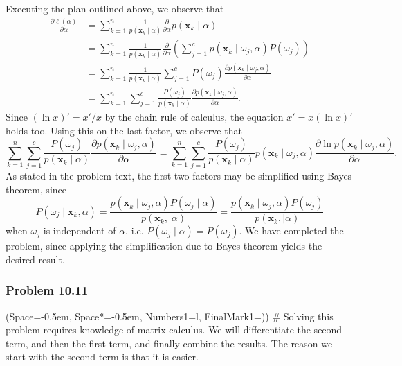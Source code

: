 \documentclass[12pt, a4paper]{article}
\newcommand{\listSpace}{-0.5em}%
\newcommand{\vect}[1]{\bm{#1}}
\begin{document}
{Executing the plan outlined above, we observe that
\begin{align*}
	\frac{\partial \ell(\alpha)}{ \partial \alpha}
	&= \sum_{k=1}^{n} \frac{1}{p \left( \vect{x}_k \mid \alpha \right)}
	\frac{\partial}{\partial \alpha}
	 p \left( \vect{x}_k \mid \alpha \right) 	\\
	&= \sum_{k=1}^{n} \frac{1}{p \left( \vect{x}_k \mid \alpha \right)}
	\frac{\partial}{\partial \alpha}
	\left( \sum_{j=1}^{c} p \left( \vect{x}_k \mid \omega_j,  \alpha \right) P(\omega_j) \right) \tag{by definition}	
	\\
	&= \sum_{k=1}^{n} \frac{1}{p \left( \vect{x}_k \mid \alpha \right)}
	 \sum_{j=1}^{c} P(\omega_j) \frac{\partial p \left( \vect{x}_k \mid \omega_j,  \alpha \right)}{\partial \alpha} 
	 \\
	 &= \sum_{k=1}^{n} \sum_{j=1}^{c} \frac{P(\omega_j)}{p \left( \vect{x}_k \mid \alpha \right)}
	   \frac{\partial p \left( \vect{x}_k \mid \omega_j,  \alpha \right)}{\partial \alpha} . \tag{constant into sum}
\end{align*}
Since $(\ln x)' = x' / x$ by the chain rule of calculus, the equation $x' = x (\ln x)'$ holds too.
Using this on the last factor, we observe that 
\begin{equation*}
	\sum_{k=1}^{n} \sum_{j=1}^{c} \frac{P(\omega_j)}{p \left( \vect{x}_k \mid \alpha \right)}
	\frac{\partial p \left( \vect{x}_k \mid \omega_j,  \alpha \right)}{\partial \alpha}
	=
	\sum_{k=1}^{n} \sum_{j=1}^{c} \frac{P(\omega_j)}{p \left( \vect{x}_k \mid \alpha \right)} 
	p \left( \vect{x}_k \mid \omega_j,  \alpha \right)
	\frac{\partial \ln p \left( \vect{x}_k \mid \omega_j,  \alpha \right)}{\partial \alpha}.
\end{equation*}
As stated in the problem text, the first two factors may be simplified using Bayes theorem, since
\begin{equation*}
	P( \omega_j \mid \vect{x}_k, \alpha) 
	= 
	\frac{p(\vect{x}_k \mid  \omega_j, \alpha) P(\omega_j \mid \alpha)}{p( \vect{x}_k,\mid \alpha)}
	= 
	\frac{p(\vect{x}_k \mid  \omega_j, \alpha) P(\omega_j)}{p( \vect{x}_k,\mid \alpha)}
\end{equation*}
when $\omega_j$ is independent of $\alpha$, i.e. $P(\omega_j \mid \alpha) = P(\omega_j )$.
We have completed the problem, since applying the simplification due to Bayes theorem yields the desired result.


\subsubsection*{Problem 10.11}
\begin{easylist}[enumerate]
\ListProperties(Space=\listSpace, Space*=\listSpace, Numbers1=l, FinalMark1={)})
# Solving this problem requires knowledge of matrix calculus.
We will differentiate the second term, and then the first term, and finally combine the results.
The reason we start with the second term is that it is easier.


\end{easylist}}
\end{document}
